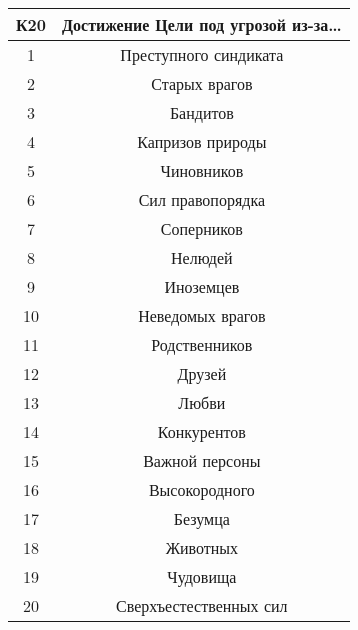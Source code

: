 \begin{center}
\begin{tabular}{ |c|c| }
\hline
\textbf{К20} & \textbf{Достижение Цели под угрозой из-за…} \\ \hline
1 & Преступного синдиката \\ \hline
2 & Старых врагов \\ \hline
3 & Бандитов \\ \hline
4 & Капризов природы \\ \hline
5 & Чиновников \\ \hline
6 & Сил правопорядка \\ \hline
7 & Соперников \\ \hline
8 & Нелюдей \\ \hline
9 & Иноземцев \\ \hline
10 & Неведомых врагов \\ \hline
11 & Родственников \\ \hline
12 & Друзей \\ \hline
13 & Любви \\ \hline
14 & Конкурентов \\ \hline
15 & Важной персоны \\ \hline
16 & Высокородного \\ \hline
17 & Безумца \\ \hline
18 & Животных \\ \hline
19 & Чудовища \\ \hline
20 & Сверхъестественных сил \\ \hline
\end{tabular}
\end{center}